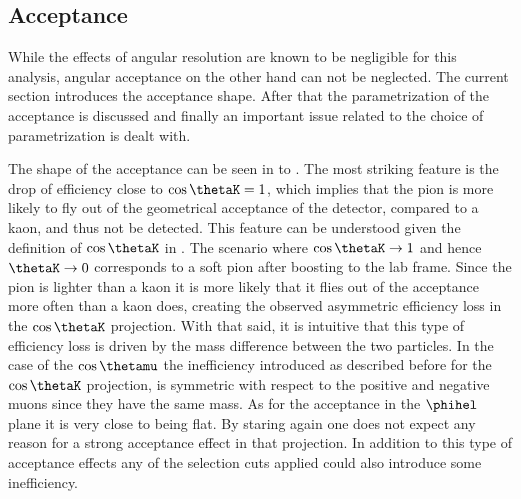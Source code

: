 \subsection{Acceptance}
\label{Accceptance}
While the effects of angular resolution are known to be negligible for this analysis, angular acceptance on the other hand can
not be neglected. The current section introduces the acceptance shape. After that the parametrization of the acceptance is discussed
and finally an important issue related to the choice of parametrization is dealt with.

The shape of the acceptance can be seen in  to . The most striking feature is the drop of efficiency 
close to $\cos\thetaK=1$, which implies that the pion is more likely to fly out of the geometrical acceptance of the detector, compared to a kaon,
and thus not be detected. This feature can be understood given the  definition of $\cos\thetaK$ in . 
The scenario where $\cos\thetaK\rightarrow 1$ and hence $\thetaK \rightarrow 0$ corresponds to a soft pion after boosting
to the lab frame. Since the pion is lighter than a kaon it is more likely that it flies out of the acceptance more
often than a kaon does, creating the observed asymmetric efficiency loss in the $\cos\thetaK$ projection. With that said, it is intuitive that
this type of efficiency loss is driven by the mass difference between the two particles. In the case of the $\cos\thetamu$ the
inefficiency introduced as described before for the $\cos\thetaK$ projection, is symmetric with respect to the positive and negative muons since 
they have the same mass. As for the acceptance in the $\phihel$ plane it is very close to being flat. By staring again  one does not expect any
reason for a strong acceptance effect in that projection. In addition to this type of acceptance effects any of the selection 
cuts applied could also introduce some inefficiency.  

